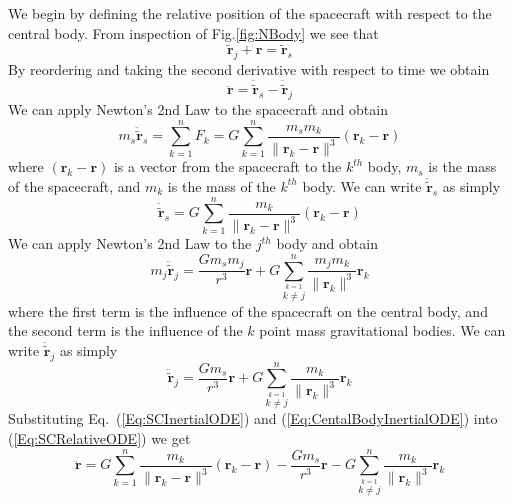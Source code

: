 We begin by defining the relative position of the spacecraft
with respect to the central body.  From inspection of
Fig.\ref{fig:NBody} we see that
%
\begin{equation}
     \tilde{\mathbf{r}}_j +  \mathbf{r} = \tilde{\mathbf{r}}_s
\end{equation}
%
By reordering and taking the second derivative with respect to time
we obtain
%
\begin{equation}
     \ddot{\mathbf{r}} = \ddot{\tilde{\mathbf{r}}}_s - \ddot{\tilde{\mathbf{r}}}_j
     \label{Eq:SCRelativeODE}
\end{equation}
%
We can apply Newton's 2nd Law to the spacecraft and obtain
%
\begin{equation}
     m_s \ddot{\tilde{\mathbf{r}}}_s = \sum_{k=1}^n F_k =
     G\sum_{k=1}^n \frac{m_s m_k}{\| \mathbf{r}_{k} - \mathbf{r}\|^3} \left(\mathbf{r}_{k} -
     \mathbf{r}\right)
\end{equation}
%
where $\left(\mathbf{r}_{k} - \mathbf{r}\right)$ is a vector from
the spacecraft to the $k^{th}$ body, $m_s$ is the mass of the
spacecraft, and $m_k$ is the mass of the $k^{th}$ body.  We can
write $\ddot{\tilde{\mathbf{r}}}_s$ as simply
%
\begin{equation}
    \ddot{\tilde{\mathbf{r}}}_s =
     G\sum_{k=1}^n \frac{m_k}{\| \mathbf{r}_{k} - \mathbf{r}\|^3} \left(\mathbf{r}_{k} -
     \mathbf{r}\right) \label{Eq:SCInertialODE}
\end{equation}
%
We can apply Newton's 2nd Law to the $j^{th}$ body and obtain
%
\begin{equation}
     m_j \ddot{\tilde{\mathbf{r}}}_j = \frac{G m_s
     m_j}{r^3}\mathbf{r} +
     G\sum_{\stackrel{k=1}{k \neq j}}^{n} \frac{m_j m_k}{\| \mathbf{r}_{k}\|^3}\mathbf{r}_{k}
\end{equation}
%
where the first term is the influence of the spacecraft on the
central body, and the second term is the influence of the $k$ point
mass gravitational bodies.  We can write
$\ddot{\tilde{\mathbf{r}}}_j$ as simply
%
\begin{equation}
     \ddot{\tilde{\mathbf{r}}}_j = \frac{G m_s
     }{r^3}\mathbf{r} +
     G\sum_{\stackrel{k=1}{k \neq j}}^{n} \frac{ m_k}{\|
     \mathbf{r}_{k}\|^3}\mathbf{r}_{k} \label{Eq:CentalBodyInertialODE}
\end{equation}
%
Substituting Eq.~(\ref{Eq:SCInertialODE}) and
(\ref{Eq:CentalBodyInertialODE}) into (\ref{Eq:SCRelativeODE}) we
get
%
\begin{equation}
     \ddot{\mathbf{r}} =      G\sum_{k=1}^n \frac{m_k}{\| \mathbf{r}_{k} - \mathbf{r}\|^3} \left(\mathbf{r}_{k} -
     \mathbf{r}\right) - \frac{G m_s
     }{r^3}\mathbf{r} -
     G\sum_{\stackrel{k=1}{k \neq j}}^{n} \frac{ m_k}{\|
     \mathbf{r}_{k}\|^3}\mathbf{r}_{k}
\end{equation}

